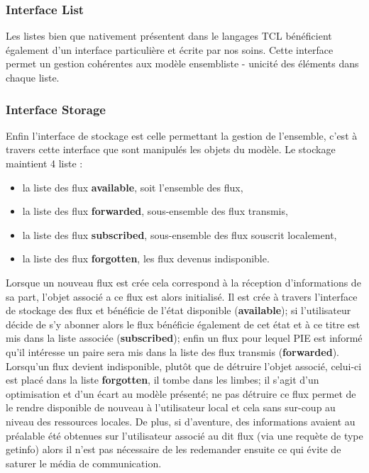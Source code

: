 \subsubsection{Interface List}

Les listes bien que nativement présentent dans le langages TCL bénéficient également
d'un interface particulière et écrite par nos soins. Cette interface permet un gestion
cohérentes aux modèle ensembliste - unicité des éléments dans chaque liste.

\subsubsection{Interface Storage}

Enfin l'interface de stockage est celle permettant la gestion de l'ensemble, c'est
à travers cette interface que sont manipulés les objets du modèle. Le stockage 
maintient 4 liste : \\

\begin{itemize}
	\item la liste des flux \textbf{available}, soit l'ensemble des flux,
	\item la liste des flux \textbf{forwarded}, sous-ensemble des flux transmis,
	\item la liste des flux \textbf{subscribed}, sous-ensemble des flux souscrit localement,
	\item la liste des flux \textbf{forgotten}, les flux devenus indisponible. \\
\end{itemize}

Lorsque un nouveau flux est crée cela correspond à la réception d'informations de sa part, l'objet
associé a ce flux est alors initialisé. Il est crée à travers l'interface de stockage des flux et
bénéficie de l'état disponible (\textbf{available}); si l'utilisateur décide de s'y abonner alors
le flux bénéficie également de cet état et à ce titre est mis dans la liste associée (\textbf{subscribed});
enfin un flux pour lequel PIE est informé qu'il intéresse un paire sera mis dans la liste des flux
transmis (\textbf{forwarded}). \\

Lorsqu'un flux devient indisponible, plutôt que de détruire l'objet associé, celui-ci est placé dans la
liste \textbf{forgotten}, il tombe dans les limbes; il s'agit d'un optimisation et d'un écart au modèle
présenté; ne pas détruire ce flux permet de le rendre disponible de nouveau à l'utilisateur local et
cela sans sur-coup au niveau des ressources locales. De plus, si d'aventure, des informations avaient
au préalable été obtenues sur l'utilisateur associé au dit flux (via une requète de type getinfo) alors
il n'est pas nécessaire de les redemander ensuite ce qui évite de saturer le média de communication. \\

